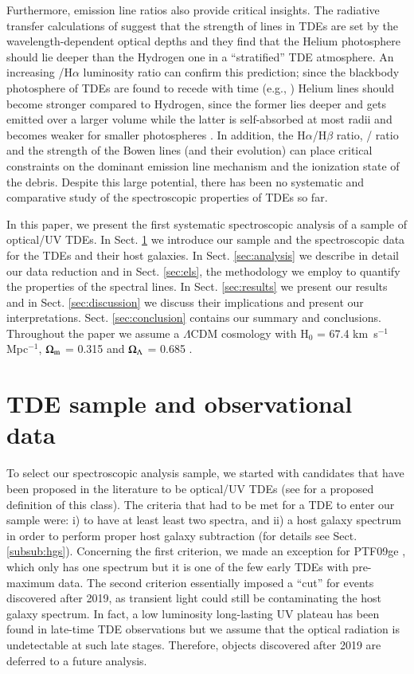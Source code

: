 \documentclass[structabstract]{aa}
\begin{document}
Furthermore, emission line ratios also provide critical insights. The radiative transfer calculations of \citet{Roth2016} suggest that the strength of lines in TDEs are set by the wavelength-dependent optical depths and they find that the Helium photosphere should lie deeper than the Hydrogen one in a ``stratified'' TDE atmosphere. An increasing /H$\alpha$ luminosity ratio can confirm this prediction; since the blackbody photosphere of TDEs are found to recede with time (e.g., \citealt{vanvelzen2021,Hinkle2021a}) Helium lines should become stronger compared to Hydrogen, since the former lies deeper and gets emitted over a larger volume while the latter is self-absorbed at most radii and becomes weaker for smaller photospheres \citep{Nicholl2019}.
In addition, the H$\alpha$/H$\beta$ ratio, / ratio and the strength of the Bowen lines (and their evolution) can place critical constraints on the dominant emission line mechanism and the ionization state of the debris. Despite this large potential, there has been no systematic and comparative study of the spectroscopic properties of TDEs so far.

\indent In this paper, we present the first systematic spectroscopic analysis of a sample of optical/UV TDEs. In Sect. \ref{sec:data} we introduce our sample and the spectroscopic data for the TDEs and their host galaxies. In Sect. \ref{sec:analysis} we describe in detail our data reduction and in Sect. \ref{sec:els}, the methodology we employ to quantify the properties of the spectral lines. In Sect. \ref{sec:results} we present our results and in Sect. \ref{sec:discussion} we discuss their implications and present our interpretations. Sect. \ref{sec:conclusion} contains our summary and conclusions. Throughout the paper we assume a $\Lambda$CDM cosmology with H$_{0}$ = 67.4 km~s$^{-1}$ Mpc$^{-1}$, $\Omega_{\rm m}$ = 0.315 and $\Omega_{\rm \Lambda}$ = 0.685 \citep{Aghanim2020}.



\section{TDE sample and observational data} \label{sec:data}
To select our spectroscopic analysis sample, we started with candidates that have been proposed in the literature to be optical/UV TDEs (see \citealt{VanVelzen2020} for a proposed definition of this class). The criteria that had to be met for a TDE to enter our sample were: i) to have at least least two spectra, and ii) a host galaxy spectrum in order to perform proper host galaxy subtraction (for details see Sect. \ref{subsub:hgs}). Concerning the first criterion, we made an exception for PTF09ge \citep{Arcavi2014}, which only has one spectrum but it is one of the few early TDEs with pre-maximum data. 
The second criterion essentially imposed a ``cut'' for events discovered after 2019, as transient light could still be contaminating the host galaxy spectrum. 
In fact, a low luminosity long-lasting UV plateau has been found in late-time TDE observations \citep{VanVelzen2019} but we assume that the optical radiation is undetectable at such late stages. 
Therefore, objects discovered after 2019 are deferred to a future analysis.
\end{document}
